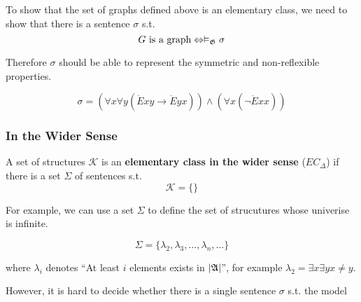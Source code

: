 To show that the set of graphs defined above is an elementary class, we need to show that there is a sentence $\sigma$ s.t.
\[ \text{$G$ is a graph} \Leftrightarrow \vDash_{\mathfrak{G}}\sigma \]

Therefore $\sigma$ should be able to represent the symmetric and non-reflexible properties.

\[\sigma = (\forall x \forall y (\dot{E}xy \to \dot{E}yx)) \wedge (\forall x(\neg \dot{E}xx))\]

\subsubsection{In the Wider Sense}

\begin{definition}
    A set of structures $\mathcal{K}$ is an \textbf{elementary class in the wider sense} ($EC_\Delta$) if there is a set $\Sigma$ of sentences s.t.
    \[ \mathcal{K} = \{\} \]
\end{definition}

For example, we can use a set $\Sigma$ to define the set of strucutures whose univerise is infinite.

\[ \Sigma = \{ \lambda_2, \lambda_3, \dots, \lambda_n, \dots \} \]

where $\lambda_i$ denotes ``At least $i$ elements exists in $|\mathfrak{A}|$'', for example $\lambda_2 = \exists x \exists y x \neq y$.

However, it is hard to decide whether there is a single sentence $\sigma$ s.t. the model
